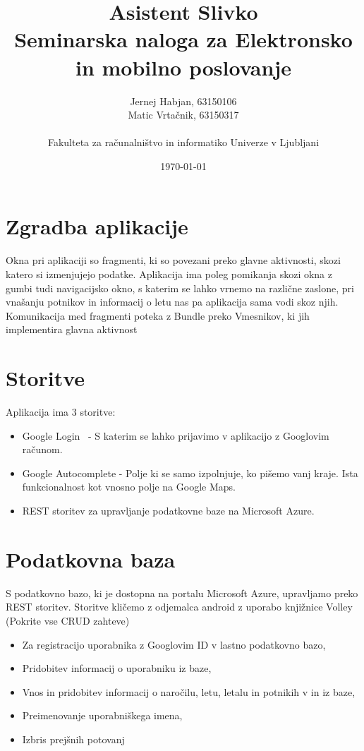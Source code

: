 \documentclass[11pt,a4paper]{article}
\title{Asistent Slivko \\
\large Seminarska naloga za Elektronsko in mobilno poslovanje}
\author{
Jernej Habjan, 63150106  \\
Matic Vrtačnik, 63150317 \\
\ \\
Fakulteta za računalništvo in informatiko Univerze v Ljubljani
\date{\today}         
}
\begin{document}
\maketitle


\section{Zgradba aplikacije}

Okna pri aplikaciji so fragmenti, ki so povezani preko glavne aktivnosti, skozi katero si izmenjujejo podatke.
Aplikacija ima poleg pomikanja skozi okna z gumbi tudi navigacijsko okno, s katerim se lahko vrnemo na različne zaslone, pri vnašanju potnikov in informacij o letu nas pa aplikacija sama vodi skoz njih.
Komunikacija med fragmenti poteka z Bundle preko Vmesnikov, ki jih implementira glavna aktivnost


\section{Storitve}
Aplikacija ima 3 storitve:
\begin{itemize}
	\item Google Login~\cite{signIn} - S katerim se lahko prijavimo v aplikacijo z Googlovim računom.
	\item Google Autocomplete\cite{autocomplete} - Polje ki se samo izpolnjuje, ko pišemo vanj kraje. Ista funkcionalnost kot vnosno polje na Google Maps.
	\item REST storitev za upravljanje podatkovne baze na Microsoft Azure.
\end{itemize}


\section{Podatkovna baza}
S podatkovno bazo, ki je dostopna na portalu Microsoft Azure, upravljamo preko REST storitev.
Storitve kličemo z odjemalca android z uporabo knjižnice Volley (Pokrite vse CRUD zahteve)
\begin{itemize}
	\item Za registracijo uporabnika z Googlovim ID v lastno podatkovno bazo,
	\item Pridobitev informacij o uporabniku iz baze,
	\item Vnos in pridobitev informacij o naročilu, letu, letalu in potnikih v in iz baze,
	\item Preimenovanje uporabniškega imena,
	\item Izbris prejšnih potovanj

\end{itemize}
\end{document}
